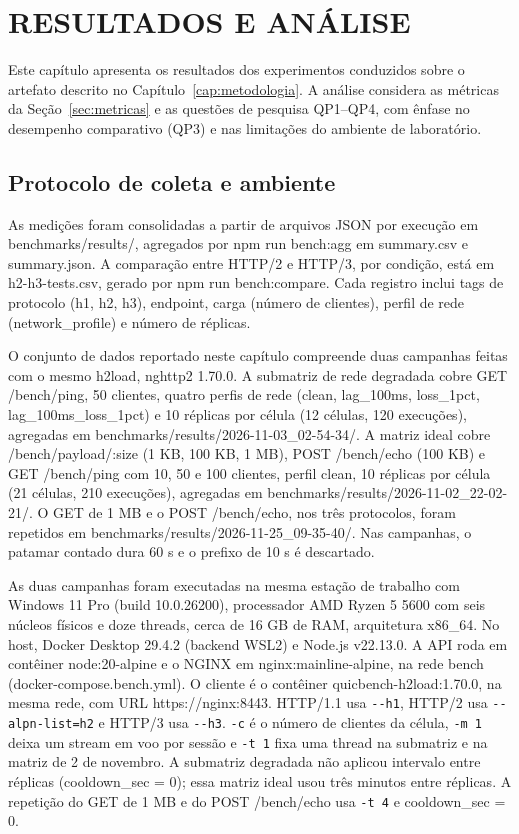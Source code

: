 ﻿\chapter{RESULTADOS E ANÁLISE}\label{cap:resultados}

Este capítulo apresenta os resultados dos experimentos conduzidos sobre o artefato descrito no Capítulo~\ref{cap:metodologia}. A análise considera as métricas da Seção~\ref{sec:metricas} e as questões de pesquisa QP1--QP4, com ênfase no desempenho comparativo (QP3) e nas limitações do ambiente de laboratório.

\section{Protocolo de coleta e ambiente}\label{sec:protocolo-coleta}

As medições foram consolidadas a partir de arquivos JSON por execução em benchmarks/results/, agregados por npm run bench:agg em summary.csv e summary.json. A comparação entre HTTP/2 e HTTP/3, por condição, está em h2-h3-tests.csv, gerado por npm run bench:compare. Cada registro inclui tags de protocolo (h1, h2, h3), endpoint, carga (número de clientes), perfil de rede (network\_profile) e número de réplicas.

O conjunto de dados reportado neste capítulo compreende duas campanhas feitas com o mesmo h2load, nghttp2 1.70.0. A submatriz de rede degradada cobre GET /bench/ping, 50 clientes, quatro perfis de rede (clean, lag\_100ms, loss\_1pct, lag\_100ms\_loss\_1pct) e 10 réplicas por célula (12 células, 120 execuções), agregadas em benchmarks/results/2026-11-03\_02-54-34/. A matriz ideal cobre /bench/payload/:size (1 KB, 100 KB, 1 MB), POST /bench/echo (100 KB) e GET /bench/ping com 10, 50 e 100 clientes, perfil clean, 10 réplicas por célula (21 células, 210 execuções), agregadas em benchmarks/results/2026-11-02\_22-02-21/. O GET de 1 MB e o POST /bench/echo, nos três protocolos, foram repetidos em benchmarks/results/2026-11-25\_09-35-40/. Nas campanhas, o patamar contado dura 60 s e o prefixo de 10 s é descartado.

As duas campanhas foram executadas na mesma estação de trabalho com Windows 11 Pro (build 10.0.26200), processador AMD Ryzen 5 5600 com seis núcleos físicos e doze threads, cerca de 16 GB de RAM, arquitetura x86\_64. No host, Docker Desktop 29.4.2 (backend WSL2) e Node.js v22.13.0. A API roda em contêiner node:20-alpine e o NGINX em nginx:mainline-alpine, na rede bench (docker-compose.bench.yml). O cliente é o contêiner quicbench-h2load:1.70.0, na mesma rede, com URL https://nginx:8443. HTTP/1.1 usa \texttt{-{}-h1}, HTTP/2 usa \texttt{-{}-alpn-list=h2} e HTTP/3 usa \texttt{-{}-h3}. \texttt{-c} é o número de clientes da célula, \texttt{-m 1} deixa um stream em voo por sessão e \texttt{-t 1} fixa uma thread na submatriz e na matriz de 2 de novembro. A submatriz degradada não aplicou intervalo entre réplicas (cooldown\_sec = 0); essa matriz ideal usou três minutos entre réplicas. A repetição do GET de 1 MB e do POST /bench/echo usa \texttt{-t 4} e cooldown\_sec = 0.

